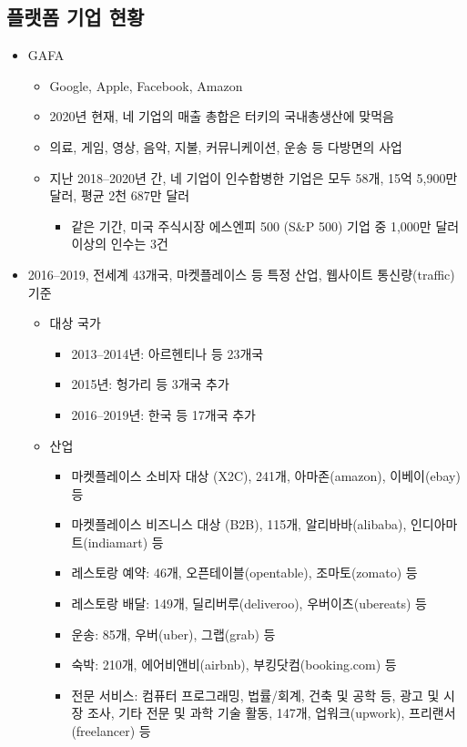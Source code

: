 \subsection{플랫폼 기업 현황}
\begin{itemize}
\item GAFA \citep{Liaubet:2021tz}
	\begin{itemize}
	\item Google, Apple, Facebook, Amazon
	\item 2020년 현재, 네 기업의 매출 총합은 터키의 국내총생산에 맞먹음
	\item 의료, 게임, 영상, 음악, 지불, 커뮤니케이션, 운송 등 다방면의 사업
	\item 지난 2018--2020년 간, 네 기업이 인수합병한 기업은 모두 58개, 15억 5,900만 달러, 평균 2천 687만 달러
		\begin{itemize}
		\item 같은 기간, 미국 주식시장 에스엔피 500 (S\&P 500) 기업 중 1,000만 달러 이상의 인수는 3건
		\end{itemize}
	\end{itemize}
\item 2016--2019, 전세계 43개국, 마켓플레이스 등 특정 산업, 웹사이트 통신량(traffic) 기준 \citep{Costa:2021up}
	\begin{itemize}
	\item 대상 국가
		\begin{itemize}
		\item 2013--2014년: 아르헨티나 등 23개국
		\item 2015년: 헝가리 등 3개국 추가
		\item 2016--2019년: 한국 등 17개국 추가
		\end{itemize}
	\item 산업
		\begin{itemize}
		\item 마켓플레이스 소비자 대상 (X2C), 241개, 아마존(amazon), 이베이(ebay) 등
		\item 마켓플레이스 비즈니스 대상 (B2B), 115개, 알리바바(alibaba), 인디아마트(indiamart) 등
		\item 레스토랑 예약: 46개, 오픈테이블(opentable), 조마토(zomato) 등
		\item 레스토랑 배달: 149개, 딜리버루(deliveroo), 우버이츠(ubereats) 등
		\item 운송: 85개, 우버(uber), 그랩(grab) 등
		\item 숙박: 210개, 에어비앤비(airbnb), 부킹닷컴(booking.com) 등
		\item 전문 서비스: 컴퓨터 프로그래밍, 법률/회계, 건축 및 공학 등, 광고 및 시장 조사, 기타 전문 및 과학 기술 활동, 147개, 업워크(upwork), 프리랜서(freelancer) 등

\end{itemize}
\end{itemize}
\end{itemize}
